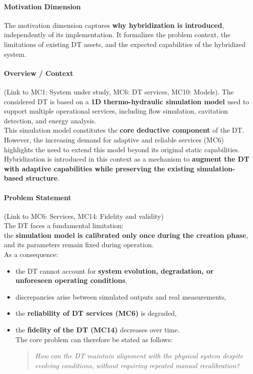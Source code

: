 \documentclass[
]{article}
\begin{document}
\paragraph{Motivation Dimension}\label{motivation-dimension}

The motivation dimension captures \textbf{why hybridization is
introduced}, independently of its implementation. It formalizes the
problem context, the limitations of existing DT assets, and the expected
capabilities of the hybridized system.

\paragraph{Overview / Context}\label{overview-context}

(Link to MC1: System under study, MC6: DT services, MC10: Models). The
considered DT is based on a \textbf{1D thermo-hydraulic simulation
model} used to support multiple operational services, including flow
simulation, cavitation detection, and energy analysis.\\
This simulation model constitutes the \textbf{core deductive component}
of the DT. However, the increasing demand for adaptive and reliable
services (MC6) highlights the need to extend this model beyond its
original static capabilities. Hybridization is introduced in this
context as a mechanism to \textbf{augment the DT with adaptive
capabilities while preserving the existing simulation-based structure}.

\paragraph{Problem Statement}\label{problem-statement}

(Link to MC6: Services, MC14: Fidelity and validity)\\
The DT faces a fundamental limitation:\\
the \textbf{simulation model is calibrated only once during the creation
phase}, and its parameters remain fixed during operation.\\
As a consequence:

\begin{itemize}
\item
  the DT cannot account for \textbf{system evolution, degradation, or
  unforeseen operating conditions},
\item
  discrepancies arise between simulated outputs and real measurements,
\item
  the \textbf{reliability of DT services (MC6)} is degraded,
\item
  the \textbf{fidelity of the DT (MC14)} decreases over time.\\
  The core problem can therefore be stated as follows:

  \begin{quote}
  \emph{How can the DT maintain alignment with the physical system
  despite evolving conditions, without requiring repeated manual
  recalibration?}
  \end{quote}
\end{itemize}
\end{document}
